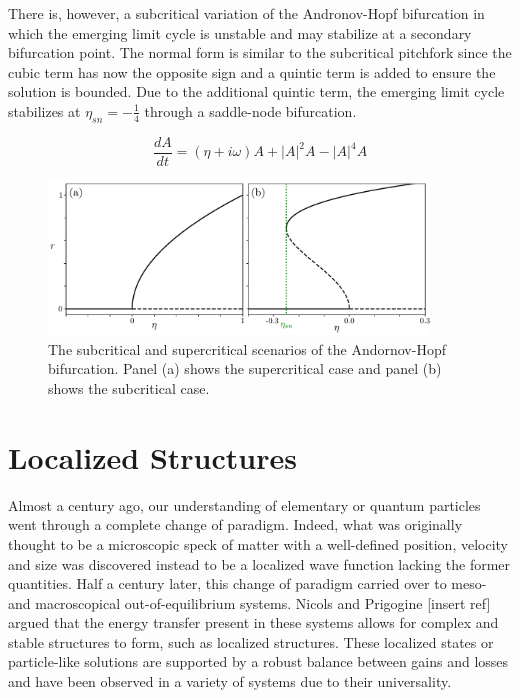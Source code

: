 There is, however, a subcritical variation
of the Andronov-Hopf bifurcation in which the emerging limit cycle is unstable and may stabilize at a secondary bifurcation point.
The normal form is similar to the subcritical pitchfork since the cubic term has now the opposite sign and a quintic term is added to ensure the solution is bounded.
Due to the additional quintic term, the emerging limit cycle stabilizes at $\eta_{sn} = -\frac14$ through
a saddle-node bifurcation.

\begin{equation}
    \dfrac{dA}{dt} = (\eta + i\omega) A + |A|^2 A - |A|^4A
\end{equation}

\begin{figure}[h]
    \centering
    \includegraphics[width=0.9\textwidth]{imagenes/framework/hopf_supersub.pdf}
    \caption{The subcritical and supercritical scenarios of the Andornov-Hopf
    bifurcation. Panel (a) shows the supercritical case and panel (b) shows the subcritical
    case.}
\end{figure}

\section{Localized Structures}
\label{sec:fra_LS}


Almost a century ago, our understanding of elementary or quantum particles went
through a complete change of paradigm. Indeed, what was originally thought
to be a microscopic speck of matter with a well-defined position, velocity and size
was discovered instead to be a localized wave function lacking the former quantities.
Half a century later, this change of paradigm carried over to meso- and macroscopical out-of-equilibrium
systems. Nicols and Prigogine [insert ref] argued that the energy transfer present in these systems
allows for complex and stable structures to form, such as localized structures. These localized states
or particle-like solutions are supported by a robust balance between gains and losses and have been observed in a
variety of systems due to their universality. 

